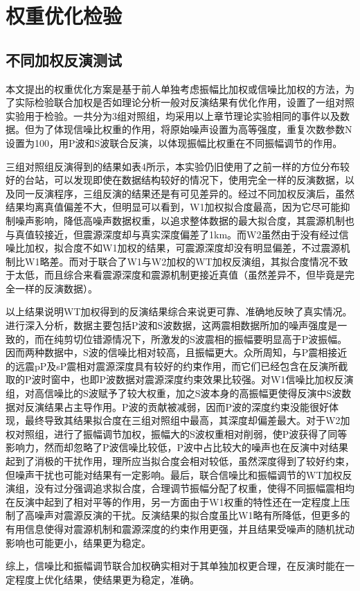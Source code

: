 \section{权重优化检验}

\subsection{不同加权反演测试}
本文提出的权重优化方案是基于前人单独考虑振幅比加权或信噪比加权的方法，为了实际检验联合加权是否如理论分析一般对反演结果有优化作用，设置了一组对照实验用于检验。一共分为3组对照组，均采用以上章节理论实验相同的事件以及数据。但为了体现信噪比权重的作用，将原始噪声设置为高等强度，重复次数参数N设置为100，用P波和S波联合反演，以体现振幅比权重在不同振幅调节的作用。

三组对照组反演得到的结果如表4所示，本实验仍旧使用了之前一样的方位分布较好的台站，可以发现即使在数据结构较好的情况下，使用完全一样的反演数据，以及同一反演程序，三组反演的结果还是有可见差异的。经过不同加权反演后，虽然结果均离真值偏差不大，但明显可以看到，W1加权拟合度最高，因为它尽可能抑制噪声影响，降低高噪声数据权重，以追求整体数据的最大拟合度，其震源机制也与真值较接近，但震源深度却与真实深度偏差了1km。而W2虽然由于没有经过信噪比加权，拟合度不如W1加权的结果，可震源深度却没有明显偏差，不过震源机制比W1略差。而对于联合了W1与W2加权的WT加权反演组，其拟合度情况不致于太低，而且综合来看震源深度和震源机制更接近真值（虽然差异不，但毕竟是完全一样的反演数据）。

以上结果说明WT加权得到的反演结果综合来说更可靠、准确地反映了真实情况。进行深入分析，数据主要包括P波和S波数据，这两震相数据所加的噪声强度是一致的，而在纯剪切位错源情况下，所激发的S波震相的振幅要明显高于P波振幅。因而两种数据中，S波的信噪比相对较高，且振幅更大。众所周知，与P震相接近的远震pP及sP震相对震源深度具有较好的约束作用，而它们已经包含在反演所截取的P波时窗中，也即P波数据对震源深度约束效果比较强。对W1信噪比加权反演组，对高信噪比的S波赋予了较大权重，加之S波本身的高振幅更使得反演中S波数据对反演结果占主导作用。P波的贡献被减弱，因而P波的深度约束没能很好体现，最终导致其结果拟合度在三组对照组中最高，其深度却偏差最大。对于W2加权对照组，进行了振幅调节加权，振幅大的S波权重相对削弱，使P波获得了同等影响力，然而却忽略了P波信噪比较低，P波中占比较大的噪声也在反演中对结果起到了消极的干扰作用，理所应当拟合度会相对较低，虽然深度得到了较好约束，但噪声干扰也可能对结果有一定影响。最后，联合信噪比和振幅调节的WT加权反演组，没有过分强调追求拟合度，合理调节振幅分配了权重，使得不同振幅震相均在反演中起到了相对平等的作用，另一方面由于W1权重的特性还在一定程度上压制了高噪声对震源反演的干扰。反演结果的拟合度虽比W1略有所降低，但更多的有用信息使得对震源机制和震源深度的约束作用更强，并且结果受噪声的随机扰动影响也可能更小，结果更为稳定。

综上，信噪比和振幅调节联合加权确实相对于其单独加权更合理，在反演时能在一定程度上优化结果，使结果更为稳定，准确。
